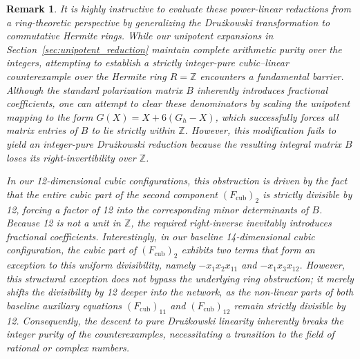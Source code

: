 \documentclass[11pt,a4paper]{article}
\newtheorem{remark}[theorem]{Remark}
\begin{document}
\begin{remark}
It is highly instructive to evaluate these power-linear reductions from a ring-theoretic perspective by generalizing the Dru\.{z}kowski transformation to commutative Hermite rings. While our unipotent expansions in Section~\ref{sec:unipotent_reduction} maintain complete arithmetic purity over the integers, attempting to establish a strictly integer-pure cubic--linear counterexample over the Hermite ring $R = \mathbb{Z}$ encounters a fundamental barrier. Although the standard polarization matrix $B$ inherently introduces fractional coefficients, one can attempt to clear these denominators by scaling the unipotent mapping to the form $G(X) = X + 6(G_h - X)$, which successfully forces all matrix entries of $B$ to lie strictly within $\mathbb{Z}$. However, this modification fails to yield an integer-pure Dru\.{z}kowski reduction because the resulting integral matrix $B$ loses its right-invertibility over $\mathbb{Z}$. 

In our 12-dimensional cubic configurations, this obstruction is driven by the fact that the entire cubic part of the second component $(F_{\text{cub}})_{2}$ is strictly divisible by 12, forcing a factor of 12 into the corresponding minor determinants of $B$. Because 12 is not a unit in $\mathbb{Z}$, the required right-inverse inevitably introduces fractional coefficients. Interestingly, in our baseline 14-dimensional cubic configuration, the cubic part of $(F_{\text{cub}})_{2}$ exhibits two terms that form an exception to this uniform divisibility, namely $-x_1x_2x_{11}$ and $-x_1x_3x_{12}$. However, this structural exception does not bypass the underlying ring obstruction; it merely shifts the divisibility by 12 deeper into the network, as the non-linear parts of both baseline auxiliary equations $(F_{\text{cub}})_{11}$ and $(F_{\text{cub}})_{12}$ remain strictly divisible by 12. Consequently, the descent to pure Drużkowski linearity inherently breaks the integer purity of the counterexamples, necessitating a transition to the field of rational or complex numbers.
\end{remark}
\end{document}
